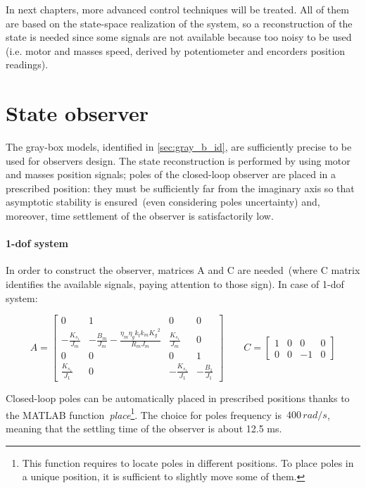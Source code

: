 
In next chapters, more advanced control techniques will be treated. All of them are based on the state-space realization of the system, so a reconstruction of the state is needed since some signals are not available because too noisy to be used (i.e. motor and masses speed, derived by potentiometer and encorders position readings).

\section{State observer}

The gray-box models, identified in \cref{sec:gray_b_id}, are sufficiently precise to be used for observers design. The state reconstruction is performed by using motor and masses position signals; poles of the closed-loop observer are placed in a prescribed position: they must be sufficiently far from the imaginary axis so that asymptotic stability is ensured~(even considering poles uncertainty) and, moreover, time settlement of the observer is satisfactorily low.

\paragraph{\acrshort{1-dof} system}

In order to construct the observer, matrices A and C are needed~(where C matrix identifies the available signals, paying attention to those sign). In case of \acrshort{1-dof} system:

\begin{equation}
	A = 
	\begin{bmatrix}
		0 &1 & 0 & 0 \\
		-\frac{K_{s_1}}{J_m} & -\frac{B_m}{J_m}-\frac{\eta_m \eta_g k_t k_m {K_g}^2}{R_m J_m}  & \frac{K_{s_1}}{J_m} & 0 \\
		0 & 0 & 0 & 1 \\
		\frac{K_{s_1}}{J_1} & 0 & -\frac{K_{s_1}}{J_1} & -\frac{B_1}{J_1}
	\end{bmatrix}
	\qquad
	C =
	\begin{bmatrix}
		1 & 0 & 0 & 0 \\
		0 & 0 & -1 & 0
	\end{bmatrix}
\label{eqn:1dof_mat_obs}
\end{equation}

Closed-loop poles can be automatically placed in prescribed positions thanks to the MATLAB function~\textit{place}\footnote{This function requires to locate poles in different positions. To place poles in a unique position, it is sufficient to slightly move some of them.}.
The choice for poles frequency is~$400 \, rad/s$, meaning that the settling time of the observer is about 12.5 ms.

